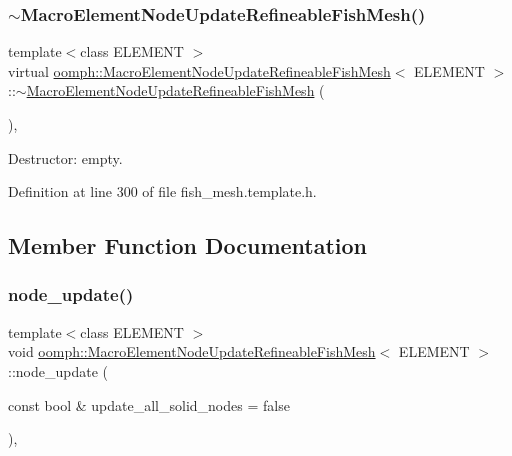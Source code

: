 \subsubsection{\texorpdfstring{$\sim$\+Macro\+Element\+Node\+Update\+Refineable\+Fish\+Mesh()}{~MacroElementNodeUpdateRefineableFishMesh()}}
{\footnotesize\ttfamily template$<$class E\+L\+E\+M\+E\+NT $>$ \\
virtual \hyperlink{classoomph_1_1MacroElementNodeUpdateRefineableFishMesh}{oomph\+::\+Macro\+Element\+Node\+Update\+Refineable\+Fish\+Mesh}$<$ E\+L\+E\+M\+E\+NT $>$\+::$\sim$\hyperlink{classoomph_1_1MacroElementNodeUpdateRefineableFishMesh}{Macro\+Element\+Node\+Update\+Refineable\+Fish\+Mesh} (\begin{DoxyParamCaption}{ }\end{DoxyParamCaption})\hspace{0.3cm}{\ttfamily [inline]}, {\ttfamily [virtual]}}



Destructor\+: empty. 



Definition at line 300 of file fish\+\_\+mesh.\+template.\+h.



\subsection{Member Function Documentation}
\mbox{\label{classoomph_1_1MacroElementNodeUpdateRefineableFishMesh_a1008dd9faa50699dcef68c8c35d6979c}} 
\subsubsection{\texorpdfstring{node\+\_\+update()}{node\_update()}}
{\footnotesize\ttfamily template$<$class E\+L\+E\+M\+E\+NT $>$ \\
void \hyperlink{classoomph_1_1MacroElementNodeUpdateRefineableFishMesh}{oomph\+::\+Macro\+Element\+Node\+Update\+Refineable\+Fish\+Mesh}$<$ E\+L\+E\+M\+E\+NT $>$\+::node\+\_\+update (\begin{DoxyParamCaption}\item[{const bool \&}]{update\+\_\+all\+\_\+solid\+\_\+nodes = {\ttfamily false} }\end{DoxyParamCaption})\hspace{0.3cm}{\ttfamily [inline]}, {\ttfamily [virtual]}}



